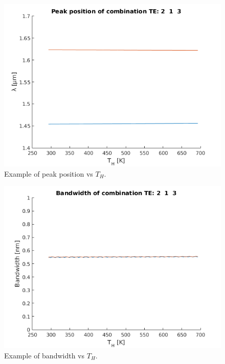 \documentclass[12pt,a4paper,twoside]{article}
\begin{document}
\begin{figure}%
	\centering
	\includegraphics[width=.64\textwidth]{ex_pos.png}
	\caption{Example of peak position vs $T_H$.}
	\label{fig_example_position}
\end{figure}
\begin{figure}%
	\centering
	\includegraphics[width=.64\textwidth]{ex_bw.png}
	\caption{Example of bandwidth vs $T_H$.}
	\label{fig_example_bandwidth}
\end{figure}

\end{document}
